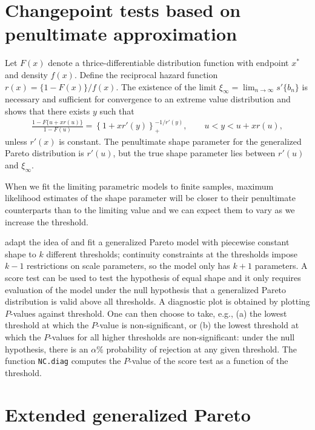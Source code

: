 \documentclass[]{book}
\begin{document}
\hypertarget{changepoint-tests-based-on-penultimate-approximation}{%
\section{Changepoint tests based on penultimate approximation}\label{changepoint-tests-based-on-penultimate-approximation}}

Let \(F(x)\) denote a thrice-differentiable distribution function with endpoint \(x^*\) and density \(f(x)\). Define the reciprocal hazard function \(r(x) = \{1-F(x)\}/f(x)\).
The existence of the limit \(\xi_{\infty} = \lim_{n \to \infty} s'\{b_n\}\) is necessary and sufficient for convergence to an extreme value distribution and \citet{Smith:1987} shows that there exists \(y\) such that
\begin{align*}
 \frac{1-F\{u+xr(u)\}}{1-F(u)} = \left\{1+xr'(y)\right\}_{+}^{-1/r'(y)}, \qquad u < y < u+xr(u),
\end{align*}
unless \(r'(x)\) is constant. The penultimate shape parameter for the generalized Pareto distribution is \(r'(u)\), but the true shape parameter lies between \(r'(u)\) and \(\xi_{\infty}\).

When we fit the limiting parametric models to finite samples, maximum likelihood estimates of the shape parameter will be closer to their penultimate counterparts than to the limiting value and we can expect them to vary as we increase the threshold.

\citet{Northrop:2014} adapt the idea of \citet{Wadsworth:2012} and fit a generalized Pareto model with piecewise constant shape to \(k\) different thresholds; continuity constraints at the thresholds impose \(k-1\) restrictions on scale parameters, so the model only has \(k+1\) parameters. A score test can be used to test the hypothesis of equal shape and it only requires evaluation of the model under the null hypothesis that a generalized Pareto distribution is valid above all thresholds. A diagnostic plot is obtained by plotting \(P\)-values against threshold. One can then choose to take, e.g., (a) the lowest threshold at which the \(P\)-value is non-significant, or (b) the lowest threshold at which the \(P\)-values for all higher thresholds are non-significant: under the null hypothesis, there is an \(\alpha\%\) probability of rejection at any given threshold. The function \texttt{NC.diag} computes the \(P\)-value of the score test as a function of the threshold.

\hypertarget{extended-generalized-pareto}{%
\section{Extended generalized Pareto}\label{extended-generalized-pareto}}
\end{document}
